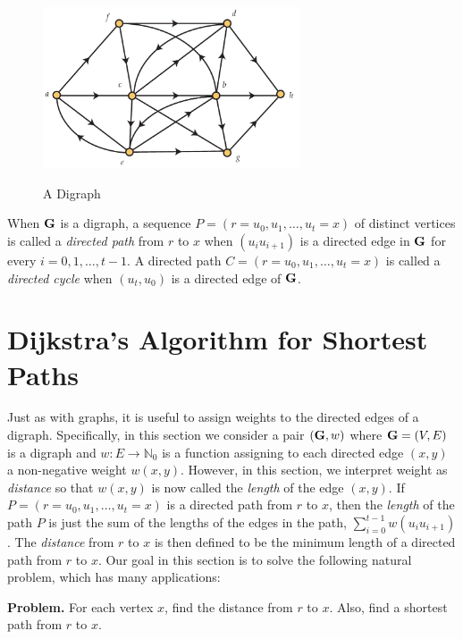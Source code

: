 \begin{figure}[t]
\begin{center}
\includegraphics[width=3in]{graphalgorithms-figs/digraph}\\
\caption{A Digraph}
\label{fig:graphalgorithms:digraph}
\end{center}
\end{figure}

When $\mathbf{G}$ is a digraph, a sequence $P=(r=u_0,u_1,\dots,u_t=x)$ of
distinct vertices is called a \textit{directed path} from $r$ to $x$
when $(u_iu_{i+1})$ is a directed edge in $\mathbf{G}$ for every
$i=0,1,\dots,t-1$.  A directed path $C=(r=u_0,u_1,\dots,u_t=x)$ is
called a \textit{directed cycle} when $(u_t,u_0)$ is a directed edge
of $\mathbf{G}$.

\section{Dijkstra's Algorithm for Shortest Paths}

Just as with graphs, it is useful to assign weights to the directed
edges of a digraph. Specifically, in this section we consider a pair
$(\mathbf{G},w)$ where $\mathbf{G}=(V,E)$ is a digraph and $w:E\rightarrow\mathbb{N}_0$
is a function assigning to each directed edge $(x,y)$ a non-negative
weight $w(x,y)$.  However, in this section, we interpret weight as
\textit{distance} so that $w(x,y)$ is now called the \textit{length}
of the edge $(x,y)$.  If $P=(r=u_0,u_1,\dots,u_t=x)$ is a directed
path from $r$ to $x$, then the \textit{length} of the path $P$ is just
the sum of the lengths of the edges in the path, $\sum_{i=0}^{t-1}
w(u_iu_{i+1})$.  The \textit{distance} from $r$ to $x$ is then defined
to be the minimum length of a directed path from $r$ to $x$. Our goal
in this section is to solve the following natural problem, which has
many applications:

\medskip
\noindent\textbf{Problem.}\quad
For each vertex $x$, find the distance from $r$ to $x$.  Also, find a
shortest path from $r$ to $x$.

